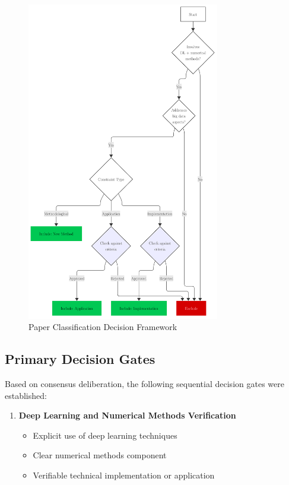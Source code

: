 \documentclass[a4paper,12pt]{article}
\begin{document}
\begin{enumerate}
\begin{figure}
\centering
\includegraphics[width=0.75\textwidth]{media/Syslit Diagram.png}
\caption{Paper Classification Decision Framework}
\label{fig:decision-flow}
\end{figure}

\subsection{Primary Decision Gates}
Based on consensus deliberation, the following sequential decision gates were established:

\begin{enumerate}
    \item \textbf{Deep Learning and Numerical Methods Verification}
    \begin{itemize}
        \item Explicit use of deep learning techniques
        \item Clear numerical methods component
        \item Verifiable technical implementation or application
    \end{itemize}


\end{enumerate}
\end{enumerate}
\end{document}
